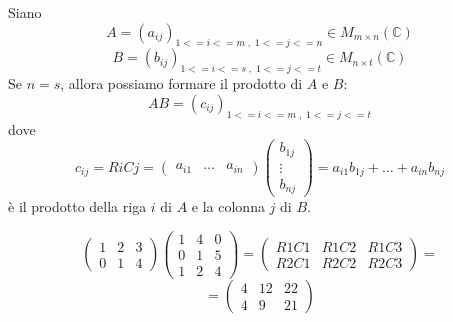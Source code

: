 \documentclass[a4paper]{article}
\theoremstyle{break}
\theoremstyle{break}
\theoremstyle{break}
\theoremstyle{break}
\begin{document}
\begin{itemize}
    Siano \[ A = (a_{ij})_{1<=i<=m\;,\;1<=j<=n} \in M_{m \times n}(\mathbb{C}) \]
    \[ B = (b_{ij})_{1<=i<=s\;,\;1<=j<=t} \in M_{n \times t}(\mathbb{C}) \]
    Se \( n=s \), allora possiamo formare il prodotto di \( A \) e \( B \):
    \[
      AB = (c_{ij})_{1<=i<=m\;,\;1<=j<=t}
    \] 
    dove
    \[
      c_{ij} = RiCj = \begin{pmatrix} a_{i1} & \ldots & a_{in} \end{pmatrix} 
      \begin{pmatrix} b_{1j} \\ \vdots \\ b_{nj} \end{pmatrix} = a_{i1}b_{1j} + \ldots + a_{in}b_{nj}
    \] 
    è il prodotto della riga \( i \) di \( A \) e la colonna \( j \) di \( B \).

    \begin{example}
      \[
        \begin{pmatrix} 1 & 2 & 3\\
        0 & 1 & 4\end{pmatrix} 
          \begin{pmatrix} 1 & 4 & 0\\
            0 & 1 & 5\\
          1 & 2 & 4\end{pmatrix} 
          =
          \begin{pmatrix} R1C1 & R1C2 & R1C3\\
            R2C1 & R2C2 & R2C3\end{pmatrix} =
          \] 
          \[
            =
            \begin{pmatrix} 
              4 & 12 & 22\\
              4 & 9 & 21
            \end{pmatrix}
          \] 
        \end{example}
\end{itemize}
\end{document}
